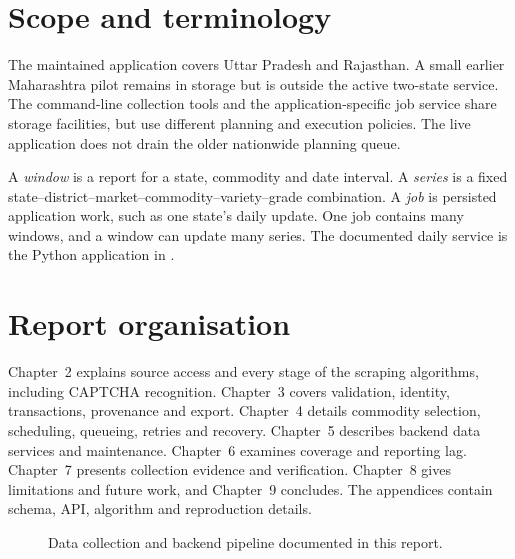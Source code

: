 \documentclass[12pt,a4paper,oneside]{report}
\numberwithin{equation}{chapter}
\numberwithin{figure}{chapter}
\numberwithin{table}{chapter}
\theoremstyle{definition}
\begin{document}
\section{Scope and terminology}
The maintained application covers Uttar Pradesh and Rajasthan. A small earlier Maharashtra pilot remains in storage but is outside the active two-state service. The command-line collection tools and the application-specific job service share storage facilities, but use different planning and execution policies. The live application does not drain the older nationwide planning queue.

A \emph{window} is a report for a state, commodity and date interval. A \emph{series} is a fixed state--district--market--commodity--variety--grade combination. A \emph{job} is persisted application work, such as one state's daily update. One job contains many windows, and a window can update many series. The documented daily service is the Python application in .

\section{Report organisation}
Chapter~2 explains source access and every stage of the scraping algorithms, including CAPTCHA recognition. Chapter~3 covers validation, identity, transactions, provenance and export. Chapter~4 details commodity selection, scheduling, queueing, retries and recovery. Chapter~5 describes backend data services and maintenance. Chapter~6 examines coverage and reporting lag. Chapter~7 presents collection evidence and verification. Chapter~8 gives limitations and future work, and Chapter~9 concludes. The appendices contain schema, API, algorithm and reproduction details.

\begin{figure}[H]
\centering
{}
\caption{Data collection and backend pipeline documented in this report.}
\label{fig:pipeline}
\end{figure}
\end{document}
